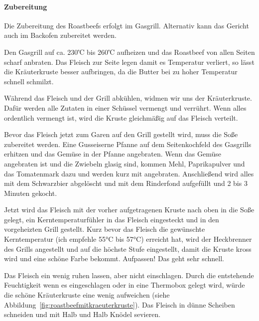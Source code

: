 \paragraph{Zubereitung}

Die Zubereitung des Roastbeefs erfolgt im Gasgrill. Alternativ kann das
Gericht auch im Backofen zubereitet werden. 

Den Gasgrill auf ca. 230℃ 
bis 260℃ aufheizen und das Roastbeef von allen Seiten scharf anbraten. Das 
Fleisch zur Seite legen damit es Temperatur verliert, so lässt die Kräuterkruste 
besser aufbringen, da die Butter bei zu hoher Temperatur schnell schmilzt.

Während das Fleisch und der Grill abkühlen, widmen wir uns der Kräuterkruste. 
Dafür werden alle Zutaten in einer Schüssel vermengt und 
verrührt.
Wenn alles ordentlich vermengt ist, wird die Kruste gleichmäßig auf das
Fleisch verteilt.

Bevor das Fleisch jetzt zum Garen auf den Grill gestellt wird, muss
die Soße zubereitet werden. Eine Gusseiserne Pfanne auf dem 
Seitenkochfeld
des Gasgrills erhitzen und das Gemüse in der Pfanne angebraten. Wenn 
das
Gemüse angebraten ist und die Zwiebeln glasig sind, kommen Mehl,
Paprikapulver und das Tomatenmark dazu und werden kurz mit 
angebraten.
Anschließend wird alles mit dem Schwarzbier abgelöscht und mit dem
Rinderfond aufgefüllt und 2 bis 3 Minuten gekocht.

Jetzt wird das Fleisch mit der vorher aufgetragenen Kruste nach oben in
die Soße gelegt, ein Kerntemperaturfühler in das Fleisch eingesteckt und in den 
vorgeheizten Grill gestellt.
Kurz bevor das Fleisch die gewünschte Kerntemperatur (ich empfehle 55°C bis 
57°C) erreicht hat, wird
der Heckbrenner des Grills angestellt und auf die höchste Stufe 
eingestellt, damit die Kruste kross wird und eine schöne Farbe bekommt. 
Aufpassen!
Das geht sehr schnell. 

Das Fleisch ein wenig ruhen lassen, aber nicht einschlagen.
Durch die entstehende Feuchtigkeit wenn es eingeschlagen oder in eine 
Thermobox gelegt wird, würde die schöne Kräuterkruste eine wenig
aufweichen (siehe Abbildung~\vref{fig:roastbeefmitkraeuterkruste}). 
Das Fleisch in dünne Scheiben schneiden und mit Halb und Halb Knödel
sevieren.

